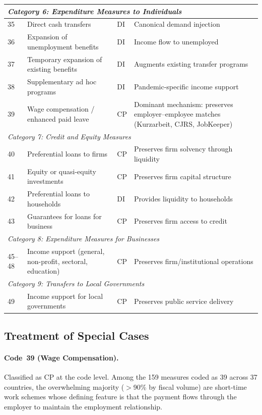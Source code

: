 \documentclass[12pt, a4paper]{article}
\begin{document}
\begin{small}
\begin{longtable}{p{0.8cm} p{5.5cm} p{1.2cm} p{5.5cm}}
\multicolumn{4}{l}{\textit{Category 6: Expenditure Measures to Individuals}} \\
\midrule
35 & Direct cash transfers & DI & Canonical demand injection \\
36 & Expansion of unemployment benefits & DI & Income flow to unemployed \\
37 & Temporary expansion of existing benefits & DI & Augments existing transfer programs \\
38 & Supplementary ad hoc programs & DI & Pandemic-specific income support \\
39 & Wage compensation / enhanced paid leave & CP & Dominant mechanism: preserves employer--employee matches (Kurzarbeit, CJRS, JobKeeper) \\
\midrule

\multicolumn{4}{l}{\textit{Category 7: Credit and Equity Measures}} \\
\midrule
40 & Preferential loans to firms & CP & Preserves firm solvency through liquidity \\
41 & Equity or quasi-equity investments & CP & Preserves firm capital structure \\
42 & Preferential loans to households & DI & Provides liquidity to households \\
43 & Guarantees for loans for business & CP & Preserves firm access to credit \\
\midrule

\multicolumn{4}{l}{\textit{Category 8: Expenditure Measures for Businesses}} \\
\midrule
45--48 & Income support (general, non-profit, sectoral, education) & CP & Preserves firm/institutional operations \\
\midrule

\multicolumn{4}{l}{\textit{Category 9: Transfers to Local Governments}} \\
\midrule
49 & Income support for local governments & CP & Preserves public service delivery \\

\end{longtable}
\end{small}

\subsection{Treatment of Special Cases}

\paragraph{Code~39 (Wage Compensation).} Classified as CP at the code level. Among the 159 measures coded as 39 across 37 countries, the overwhelming majority ($>$90\% by fiscal volume) are short-time work schemes whose defining feature is that the payment flows through the employer to maintain the employment relationship.
\end{document}
